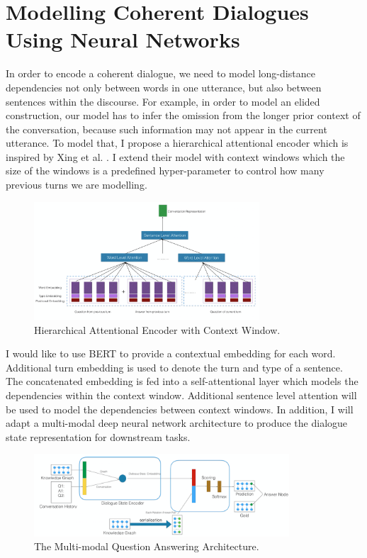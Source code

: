 \documentclass[bsc,frontabs,twoside,singlespacing,parskip,deptreport]{infthesis}     %
\begin{document}
\chapter{Modelling Coherent Dialogues Using Neural Networks}


In order to encode a coherent dialogue, we need to model long-distance dependencies not only between words in one utterance, but also between sentences within the discourse. For example, in order to model an elided construction, our model has to infer the omission from the longer prior context of the conversation, because such information may not appear in the current utterance. To model that, I propose a hierarchical attentional encoder which is inspired by Xing et al. \cite{xing2018hierarchical}. I extend their model with context windows which the size of the windows is a predefined hyper-parameter to control how many previous turns we are modelling. 


\begin{figure}[h]
    \centering
    \includegraphics[width=0.75\textwidth]{attemodel.png}
    \caption{Hierarchical Attentional Encoder with Context Window.}
    \label{fig:mesh1}
\end{figure}

I would like to use BERT\cite{devlin2018bert} to provide a contextual embedding for each word. Additional turn embedding is used to denote the turn and type of a sentence. The concatenated embedding is fed into a self-attentional layer which models the dependencies within the context window. Additional sentence level attention will be used to model the dependencies between context windows. In addition, I will adapt a multi-modal deep neural network architecture to produce the dialogue state representation for downstream tasks.

\begin{figure}[h]
    \centering
    \includegraphics[width=0.85\textwidth]{qa1pro.png}
    \caption{The Multi-modal Question Answering Architecture.}
    \label{fig:mesh1}
\end{figure}
\end{document}
